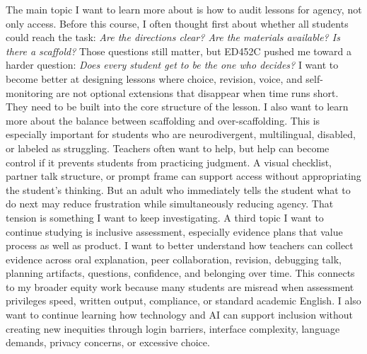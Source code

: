 \documentclass[11pt]{article}
\newcommand{\reviewsection}[1]{\vspace{0.07in}\noindent{\normalsize\bfseries\color{PrimaryRed}#1}\par\vspace{0.02in}}
\begin{document}
The main topic I want to learn more about is how to audit lessons for agency, not only access. Before this course, I often thought first about whether all students could reach the task: \textit{Are the directions clear? Are the materials available? Is there a scaffold? }Those questions still matter, but ED452C pushed me toward a harder question: \textit{Does every student get to be the one who decides?} I want to become better at designing lessons where choice, revision, voice, and self-monitoring are not optional extensions that disappear when time runs short. They need to be built into the core structure of the lesson. I also want to learn more about the balance between scaffolding and over-scaffolding. This is especially important for students who are neurodivergent, multilingual, disabled, or labeled as struggling. Teachers often want to help, but help can become control if it prevents students from practicing judgment. A visual checklist, partner talk structure, or prompt frame can support access without appropriating the student's thinking. But an adult who immediately tells the student what to do next may reduce frustration while simultaneously reducing agency. That tension is something I want to keep investigating. A third topic I want to continue studying is inclusive assessment, especially evidence plans that value process as well as product. I want to better understand how teachers can collect evidence across oral explanation, peer collaboration, revision, debugging talk, planning artifacts, questions, confidence, and belonging over time. This connects to my broader equity work because many students are misread when assessment privileges speed, written output, compliance, or standard academic English. I also want to continue learning how technology and AI can support inclusion without creating new inequities through login barriers, interface complexity, language demands, privacy concerns, or excessive choice.

\reviewsection{How I Will Pursue Further Learning}
\end{document}
